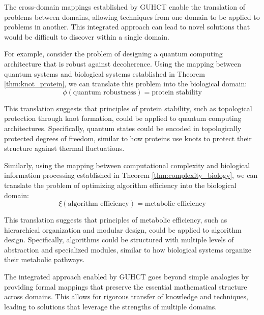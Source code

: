\documentclass[11pt,a4paper]{article}
\makeatletter
\renewenvironment{proof}[1][\proofname]{\par
  \pushQED{\qed}%
  \normalfont \topsep6\p@\@plus6\p@\relax
  \trivlist
  \item[\hskip\labelsep
        \itshape
    #1\@addpunct{.}]\ignorespaces
}{%
  \popQED\endtrivlist\@endpefalse
}
\makeatother
\begin{document}
\begin{proof}
The cross-domain mappings established by GUHCT enable the translation of problems between domains, allowing techniques from one domain to be applied to problems in another. This integrated approach can lead to novel solutions that would be difficult to discover within a single domain.

For example, consider the problem of designing a quantum computing architecture that is robust against decoherence. Using the mapping between quantum systems and biological systems established in Theorem \ref{thm:knot_protein}, we can translate this problem into the biological domain:
\begin{equation}
\phi(\text{quantum robustness}) = \text{protein stability}
\end{equation}

This translation suggests that principles of protein stability, such as topological protection through knot formation, could be applied to quantum computing architectures. Specifically, quantum states could be encoded in topologically protected degrees of freedom, similar to how proteins use knots to protect their structure against thermal fluctuations.

Similarly, using the mapping between computational complexity and biological information processing established in Theorem \ref{thm:complexity_biology}, we can translate the problem of optimizing algorithm efficiency into the biological domain:
\begin{equation}
\xi(\text{algorithm efficiency}) = \text{metabolic efficiency}
\end{equation}

This translation suggests that principles of metabolic efficiency, such as hierarchical organization and modular design, could be applied to algorithm design. Specifically, algorithms could be structured with multiple levels of abstraction and specialized modules, similar to how biological systems organize their metabolic pathways.

The integrated approach enabled by GUHCT goes beyond simple analogies by providing formal mappings that preserve the essential mathematical structure across domains. This allows for rigorous transfer of knowledge and techniques, leading to solutions that leverage the strengths of multiple domains.
\end{proof}
\end{document}
